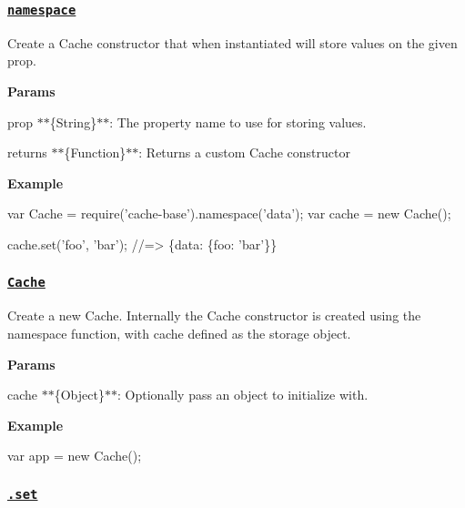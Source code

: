 \subsubsection*{\href{index.js#L29}{\tt namespace}}

Create a {\ttfamily Cache} constructor that when instantiated will store values on the given {\ttfamily prop}.

{\bfseries Params}


\begin{DoxyItemize}
\item {\ttfamily prop} $\ast$$\ast$\{String\}$\ast$$\ast$\+: The property name to use for storing values.
\item {\ttfamily returns} $\ast$$\ast$\{Function\}$\ast$$\ast$\+: Returns a custom {\ttfamily Cache} constructor
\end{DoxyItemize}

{\bfseries Example}


\begin{DoxyCode}
var Cache = require('cache-base').namespace('data');
var cache = new Cache();

cache.set('foo', 'bar');
//=> \{data: \{foo: 'bar'\}\}
\end{DoxyCode}


\subsubsection*{\href{index.js#L43}{\tt Cache}}

Create a new {\ttfamily Cache}. Internally the {\ttfamily Cache} constructor is created using the {\ttfamily namespace} function, with {\ttfamily cache} defined as the storage object.

{\bfseries Params}


\begin{DoxyItemize}
\item {\ttfamily cache} $\ast$$\ast$\{Object\}$\ast$$\ast$\+: Optionally pass an object to initialize with.
\end{DoxyItemize}

{\bfseries Example}


\begin{DoxyCode}
var app = new Cache();
\end{DoxyCode}


\subsubsection*{\href{index.js#L84}{\tt .set}}

